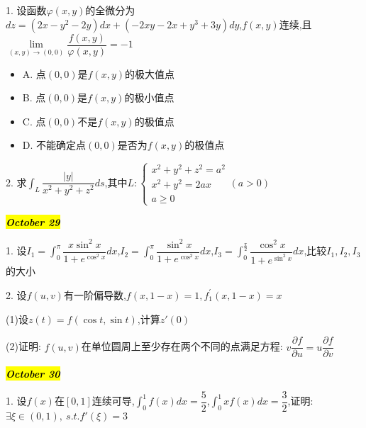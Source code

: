 1. 设函数$\varphi(x,y)$的全微分为$dz=(2x-y^2-2y)dx+(-2xy-2x+y^3+3y)dy$,$f(x,y)$连续,且$\lim\limits_{(x,y)\rightarrow (0,0)}\dfrac{f(x,y)}{\varphi(x,y)}=-1$
\begin{itemize}
	\item A. 点$(0,0)$是$f(x,y)$的极大值点
	\item B. 点$(0,0)$是$f(x,y)$的极小值点
	\item C. 点$(0,0)$不是$f(x,y)$的极值点
	\item D. 不能确定点$(0,0)$是否为$f(x,y)$的极值点
\end{itemize}
\begin{solution}
	
\end{solution}

2. 求$\int_{L}\dfrac{|y|}{x^2+y^2+z^2}ds$,其中$L:\left\lbrace 
\begin{array}{l}
	x^2+y^2+z^2=a^2\\
	x^2+y^2=2ax\\
	a\geq 0
\end{array}
\right. (a>0)$

\begin{solution}
	
\end{solution}

\hl{\textbf{\textit{October 29}}}

1. 设$I_{1}=\int_{0}^{\pi}\dfrac{x\sin^2 x}{1+e^{\cos^2 x}}dx$,$I_{2}=\int_{0}^{\pi}\dfrac{\sin^2 x}{1+e^{\cos^2 x}}dx$,$I_{3}=\int_{0}^{\frac{\pi}{2}}\dfrac{\cos^2 x}{1+e^{\sin^2 x}}dx$,比较$I_{1},I_{2},I_{3}$的大小
\begin{solution}
	
\end{solution}

2. 设$f(u,v)$有一阶偏导数,$f(x,1-x)=1,f_{1}^{'}(x,1-x)=x$

(1)设$z(t)=f(\cos t,\sin t)$,计算$z'(0)$

(2)证明:  $f(u,v)$在单位圆周上至少存在两个不同的点满足方程:  $v\dfrac{\partial f}{\partial u}=u\dfrac{\partial f}{\partial v}$
\begin{solution}
	
\end{solution}

\hl{\textbf{\textit{October 30}}}

1. 设$f(x)$在$[0,1]$连续可导,$\int_{0}^{1}f(x)dx=\dfrac{5}{2}$,$\int_{0}^{1}xf(x)dx=\dfrac{3}{2}$,证明:$\exists \xi\in(0,1),\ s.t. f'(\xi)=3$
\begin{solution}
	
\end{solution}

